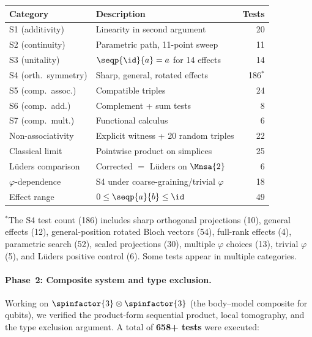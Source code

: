 \begin{center}
\begin{tabular}{@{}llr@{}}
\toprule
Category & Description & Tests \\
\midrule
S1 (additivity)      & Linearity in second argument       & 20 \\
S2 (continuity)      & Parametric path, 11-point sweep     & 11 \\
S3 (unitality)       & $\seqp{\id}{a} = a$ for 14 effects    & 14 \\
S4 (orth.\ symmetry) & Sharp, general, rotated effects     & 186$^{*}$ \\
S5 (comp.\ assoc.)   & Compatible triples                  & 24 \\
S6 (comp.\ add.)     & Complement + sum tests              & 8 \\
S7 (comp.\ mult.)    & Functional calculus                  & 6 \\
Non-associativity    & Explicit witness + 20 random triples & 22 \\
Classical limit      & Pointwise product on simplices       & 25 \\
L\"uders comparison  & Corrected $=$ L\"uders on $\Mnsa{2}$ & 6 \\
$\varphi$-dependence & S4 under coarse-graining/trivial $\varphi$ & 18 \\
Effect range         & $0 \leq \seqp{a}{b} \leq \id$         & 49 \\
\bottomrule
\end{tabular}
\end{center}

\noindent ${}^{*}$The S4 test count (186) includes sharp orthogonal
projections (10), general effects (12), general-position rotated Bloch
vectors (54), full-rank effects (4), parametric search (52), scaled
projections (30), multiple $\varphi$ choices (13), trivial $\varphi$
(5), and L\"uders positive control (6).  Some tests appear in multiple
categories.

\paragraph{Phase~2: Composite system and type exclusion.}
Working on $\spinfactor{3} \otimes \spinfactor{3}$ (the body--model
composite for qubits), we verified the product-form sequential
product, local tomography, and the type exclusion argument.
A total of \textbf{658+ tests} were executed:

